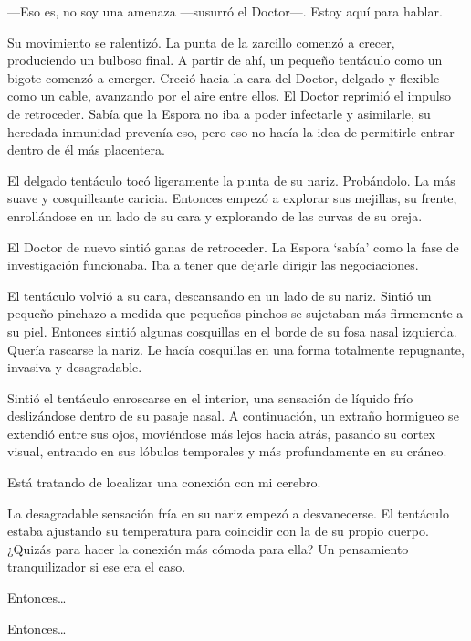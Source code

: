 ---Eso es, no soy una amenaza ---susurró el Doctor---. Estoy aquí para
hablar.

Su movimiento se ralentizó. La punta de la zarcillo comenzó a crecer,
produciendo un bulboso final. A partir de ahí, un pequeño tentáculo como
un bigote comenzó a emerger. Creció hacia la cara del Doctor, delgado y
flexible como un cable, avanzando por el aire entre ellos. El Doctor
reprimió el impulso de retroceder. Sabía que la Espora no iba a poder
infectarle y asimilarle, su heredada inmunidad prevenía eso, pero eso no
hacía la idea de permitirle entrar dentro de él más placentera.

El delgado tentáculo tocó ligeramente la punta de su nariz. Probándolo.
La más suave y cosquilleante caricia. Entonces empezó a explorar sus
mejillas, su frente, enrollándose en un lado de su cara y explorando de
las curvas de su oreja.

El Doctor de nuevo sintió ganas de retroceder. La Espora `sabía' como la
fase de investigación funcionaba. Iba a tener que dejarle dirigir las
negociaciones.

El tentáculo volvió a su cara, descansando en un lado de su nariz.
Sintió un pequeño pinchazo a medida que pequeños pinchos se sujetaban
más firmemente a su piel. Entonces sintió algunas cosquillas en el borde
de su fosa nasal izquierda. Quería rascarse la nariz. Le hacía
cosquillas en una forma totalmente repugnante, invasiva y desagradable.

Sintió el tentáculo enroscarse en el interior, una sensación de líquido
frío deslizándose dentro de su pasaje nasal. A continuación, un extraño
hormigueo se extendió entre sus ojos, moviéndose más lejos hacia atrás,
pasando su cortex visual, entrando en sus lóbulos temporales y más
profundamente en su cráneo.

Está tratando de localizar una conexión con mi cerebro.

La desagradable sensación fría en su nariz empezó a desvanecerse. El
tentáculo estaba ajustando su temperatura para coincidir con la de su
propio cuerpo. ¿Quizás para hacer la conexión más cómoda para ella? Un
pensamiento tranquilizador si ese era el caso.

Entonces\ldots{}

Entonces\ldots{}